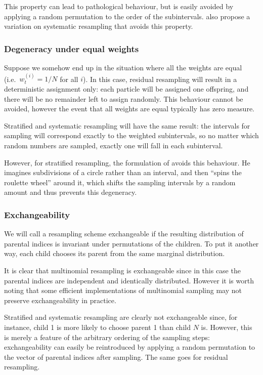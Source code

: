 \documentclass[fleqn]{article}
\theoremstyle{definition}
\newcommand{\wt}[2][t]{w_{#1}^{(#2)}}
\begin{document}
This property can lead to pathological behaviour, but is easily avoided by applying a random permutation to the order of the subintervals.
\citet{gerber2017} also propose a variation on systematic resampling that avoids this property.

\subsubsection{Degeneracy under equal weights}
Suppose we somehow end up in the situation where all the weights are equal (i.e.\ $\wt{i} = 1/N$ for all $i$).
In this case, residual resampling will result in a deterministic assignment only: each particle will be assigned one offspring, and there will be no remainder left to assign randomly. This behaviour cannot be avoided, however the event that all weights are equal typically has zero measure.

Stratified and systematic resampling will have the same result: the intervals for sampling will correspond exactly to the weighted subintervals, so no matter which random numbers are sampled, exactly one will fall in each subinterval.

However, for stratified resampling, the formulation of \citet{whitley1994} avoids this behaviour. He imagines subdivisions of a circle rather than an interval, and then ``spins the roulette wheel'' around it, which shifts the sampling intervals by a random amount and thus prevents this degeneracy.

\subsubsection{Exchangeability}
We will call a resampling scheme exchangeable if the resulting distribution of parental indices is invariant under permutations of the children. To put it another way, each child chooses its parent from the same marginal distribution.

It is clear that multinomial resampling is exchangeable since in this case the parental indices are independent and identically distributed. However it is worth noting that some efficient implementations of multinomial sampling may not preserve exchangeability in practice.

Stratified and systematic resampling are clearly not exchangeable since, for instance, child 1 is more likely to choose parent 1 than child $N$ is. However, this is merely a feature of the arbitrary ordering of the sampling steps: exchangeability can easily be reintroduced by applying a random permutation to the vector of parental indices after sampling.
The same goes for residual resampling.
\end{document}
